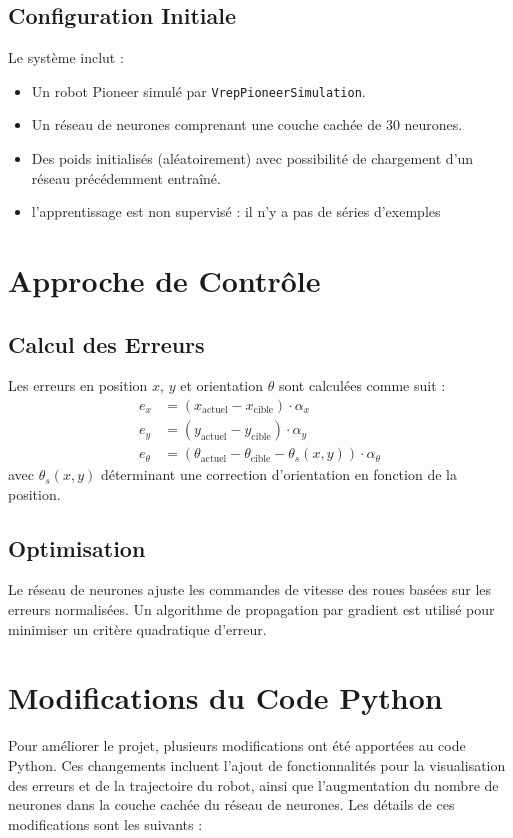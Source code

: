 \documentclass{article}
\begin{document}
\subsection*{Configuration Initiale}
Le système inclut :
\begin{itemize}
    \item Un robot Pioneer simulé par \texttt{VrepPioneerSimulation}.
    \item Un réseau de neurones comprenant une couche cachée de 30 neurones.
    \item Des poids initialisés (aléatoirement) avec possibilité de chargement d'un réseau précédemment entraîné.
    \item l'apprentissage est non supervisé : il n'y a pas de séries d'exemples
\end{itemize}

\section{Approche de Contrôle}
\subsection*{Calcul des Erreurs}
Les erreurs en position $x$, $y$ et orientation $\theta$ sont calculées comme suit :
\begin{align*}
    e_x &= (x_{\text{actuel}} - x_{\text{cible}}) \cdot \alpha_x \\
    e_y &= (y_{\text{actuel}} - y_{\text{cible}}) \cdot \alpha_y \\
    e_\theta &= \left(\theta_{\text{actuel}} - \theta_{\text{cible}} - \theta_s(x, y)\right) \cdot \alpha_\theta
\end{align*}
avec $\theta_s(x, y)$ déterminant une correction d'orientation en fonction de la position.

\subsection*{Optimisation}
Le réseau de neurones ajuste les commandes de vitesse des roues basées sur les erreurs normalisées. Un algorithme de propagation par gradient est utilisé pour minimiser un critère quadratique d'erreur.

\newpage
\section{Modifications du Code Python}
Pour améliorer le projet, plusieurs modifications ont été apportées au code Python. Ces changements incluent l'ajout de fonctionnalités pour la visualisation des erreurs et de la trajectoire du robot, ainsi que l'augmentation du nombre de neurones dans la couche cachée du réseau de neurones. Les détails de ces modifications sont les suivants :
\end{document}
